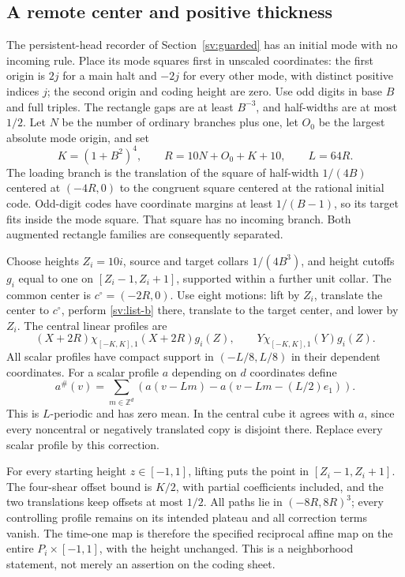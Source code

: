 \subsection{A remote center and positive thickness}
\label{sv:remote}
The persistent-head recorder of Section~\ref{sv:guarded} has an
initial mode with no incoming rule.  Place its mode squares first in
unscaled coordinates: the first origin is $2j$ for a main halt and
$-2j$ for every other mode, with distinct positive indices $j$;
the second origin and coding height are zero.  Use odd digits in base
$B$ and full triples.  The rectangle gaps are at least $B^{-3}$,
and half-widths are at most $1/2$.  Let $N$ be the number of
ordinary branches plus one, let $O_0$ be the largest absolute mode
origin, and set
\[
 K=(1+B^2)^4,\qquad R=10N+O_0+K+10,\qquad L=64R.
\]
The loading branch is the translation of the square of half-width
$1/(4B)$ centered at $(-4R,0)$ to the congruent square centered
at the rational initial code.  Odd-digit codes have coordinate
margins at least $1/(B-1)$, so its target fits inside the mode
square.  That square has no incoming branch.  Both augmented rectangle
families are consequently separated.

Choose heights $Z_i=10i$, source and target collars $1/(4B^3)$,
and height cutoffs $g_i$ equal to one on $[Z_i-1,Z_i+1]$, supported
within a further unit collar.  The common center is $c^\circ=(-2R,0)$.
Use eight motions: lift by $Z_i$, translate the center to $c^\circ$,
perform \eqref{sv:list-b} there, translate to the target center,
and lower by $Z_i$.  The central linear profiles are
\[
 (X+2R)\chi_{[-K,K],1}(X+2R)g_i(Z),\qquad
 Y\chi_{[-K,K],1}(Y)g_i(Z).
\]
All scalar profiles have compact support in $(-L/8,L/8)$ in their
dependent coordinates.  For a scalar profile $a$ depending on $d$
coordinates define
\begin{equation}\label{sv:remote-correction}
 a^\#(v)=\sum_{m\in\mathbb Z^d}
 \left(a(v-Lm)-a(v-Lm-(L/2)e_1)\right).
\end{equation}
This is $L$-periodic and has zero mean.  In the central cube it
agrees with $a$, since every noncentral or negatively translated copy
is disjoint there.  Replace every scalar profile by this correction.

For every starting height $z\in[-1,1]$, lifting puts the point in
$[Z_i-1,Z_i+1]$.  The four-shear offset bound is $K/2$, with
partial coefficients included, and the two translations keep offsets
at most $1/2$.  All paths lie in $(-8R,8R)^3$; every controlling
profile remains on its intended plateau and all correction terms vanish.
The time-one map is therefore the specified reciprocal affine map on
the entire $P_i\times[-1,1]$, with the height unchanged.  This is
a neighborhood statement, not merely an assertion on the coding sheet.

